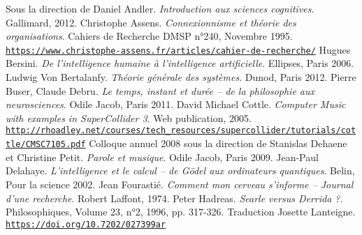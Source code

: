 \vspace{-1cm}
\renewcommand{\refname}{}
\makeatletter
\renewcommand\@biblabel[1]{}
\makeatother
\renewcommand\bibpreamble{$\rightarrow$ Here is the list of books, articles and  web pages that have been used in some way in the development of this work.\bigskip}

\begin{thebibliography}{99}
        		 
        \bibitem[-, 2012]{}Sous la direction de Daniel Andler. \textit{Introduction aux sciences cognitives}. Gallimard, 2012.
        \bibitem[-, 1995]{}Christophe Assens. \textit{Connexionnisme et théorie des organisations}. Cahiers de Recherche DMSP n°240, Novembre 1995.\\ \href{https://www.christophe-assens.fr/articles/cahier-de-recherche/}{\scriptsize{\texttt{https://www.christophe-assens.fr/articles/cahier-de-recherche/}}} \normalsize{}
        \bibitem[-, 2006]{}Hugues Bersini. \textit{De l'intelligence humaine à l'intelligence artificielle}. Ellipses, Paris 2006.
        \bibitem[-, 2012]{}Ludwig Von Bertalanfy. \textit{Théorie générale des systèmes}. Dunod, Paris 2012.
        \bibitem[-, 2011]{}Pierre Buser, Claude Debru. \textit{Le temps, instant et durée -- de la philosophie aux neurosciences}. Odile Jacob, Paris 2011.
        \bibitem[-, 2005]{}David Michael Cottle. \textit{Computer Music with examples in SuperCollider 3}. Web publication, 2005.\\ \href{http://rhoadley.net/courses/tech\_resources/supercollider/tutorials/cottle/CMSC7105.pdf}{\scriptsize{\texttt{http://rhoadley.net/courses/tech\_resources/supercollider/tutorials/cottle/CMSC7105.pdf}}} \normalsize{}
        \bibitem[-, 2009]{}Colloque annuel 2008 sous la direction de Stanislas Dehaene et Christine Petit. \textit{Parole et musique}. Odile Jacob, Paris 2009.
        \bibitem[-, 2002]{}Jean-Paul Delahaye. \textit{L'intelligence et le calcul -- de Gödel aux ordinateurs quantiques}. Belin, Pour la science 2002.
        \bibitem[-, 1974]{}Jean Fourastié. \textit{Comment mon cerveau s'informe -- Journal d'une recherche}. Robert Laffont, 1974.
                \bibitem[-, 1996]{}Peter Hadreas. \textit{Searle versus Derrida ?}. Philosophiques, Volume 23, n°2, 1996, pp. 317-326. Traduction Josette Lanteigne.\\ \href{https://doi.org/10.7202/027399ar}{\scriptsize{\texttt{https://doi.org/10.7202/027399ar}}} \normalsize{}


\end{thebibliography}
